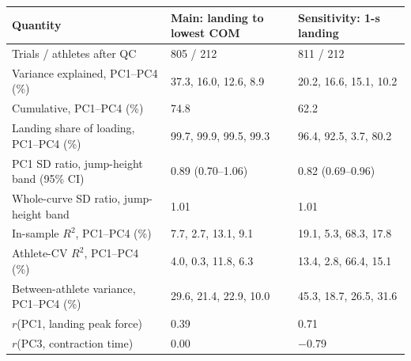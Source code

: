 \begin{tabular}{lll}
\toprule
Quantity & Main: landing to lowest COM & Sensitivity: 1-s landing \\
\midrule
Trials / athletes after QC & 805 / 212 & 811 / 212 \\
Variance explained, PC1--PC4 (\%) & 37.3, 16.0, 12.6, 8.9 & 20.2, 16.6, 15.1, 10.2 \\
Cumulative, PC1--PC4 (\%) & 74.8 & 62.2 \\
Landing share of loading, PC1--PC4 (\%) & 99.7, 99.9, 99.5, 99.3 & 96.4, 92.5, 3.7, 80.2 \\
PC1 SD ratio, jump-height band (95\% CI) & 0.89 (0.70--1.06) & 0.82 (0.69--0.96) \\
Whole-curve SD ratio, jump-height band & 1.01 & 1.01 \\
In-sample $R^2$, PC1--PC4 (\%) & 7.7, 2.7, 13.1, 9.1 & 19.1, 5.3, 68.3, 17.8 \\
Athlete-CV $R^2$, PC1--PC4 (\%) & 4.0, 0.3, 11.8, 6.3 & 13.4, 2.8, 66.4, 15.1 \\
Between-athlete variance, PC1--PC4 (\%) & 29.6, 21.4, 22.9, 10.0 & 45.3, 18.7, 26.5, 31.6 \\
$r$(PC1, landing peak force) & 0.39 & 0.71 \\
$r$(PC3, contraction time) & 0.00 & $-$0.79 \\
\bottomrule
\end{tabular}

